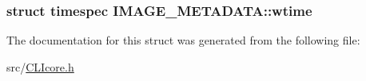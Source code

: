 \subsubsection[{wtime}]{\setlength{\rightskip}{0pt plus 5cm}struct timespec I\+M\+A\+G\+E\+\_\+\+M\+E\+T\+A\+D\+A\+T\+A\+::wtime}\label{structIMAGE__METADATA_a5a4dfe37e26ea28f88f85df4dde00600}


The documentation for this struct was generated from the following file\+:\begin{DoxyCompactItemize}
\item 
src/\hyperlink{CLIcore_8h}{C\+L\+Icore.\+h}\end{DoxyCompactItemize}
